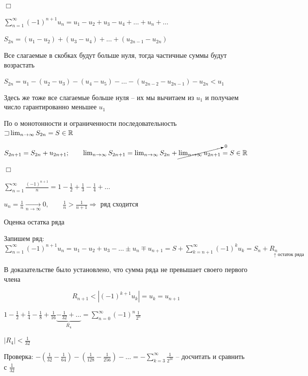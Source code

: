\documentclass[12pt]{article}
\begin{document}
    \begin{MyProof}
        $\Box$

        $\sum_{n = 1}^\infty (-1)^{n + 1} u_n = u_1 - u_2 + u_3 - u_4 + \dots + u_n + \dots$

        $S_{2n} = (u_1 - u_2) + (u_3 - u_4) + \dots + (u_{2n - 1} - u_{2n})$

        Все слагаемые в скобках будут больше нуля, тогда частичные суммы будут возрастать

        $S_{2n} = u_1 - (u_2 - u_3) - (u_4 - u_5) - \dots - (u_{2n - 2} - u_{2n - 1}) - u_{2n} < u_1$

        Здесь же тоже все слагаемые больше нуля -- их мы вычитаем из $u_1$ и получаем число гарантированно меньшее $u_1$

        По \Ths о монотонности и ограниченности последовательность $\mathord{\sqsupset} \lim_{n \to \infty} S_{2n} = S \in \mathbb{R}$

        $S_{2n + 1} = S_{2n} + u_{2n + 1}; \qquad \lim_{n \to \infty} S_{2n + 1} = \lim_{n \to \infty} S_{2n} + \cancelto{0}{\lim_{n \to \infty} u_{2n + 1}} = S \in \mathbb{R}$

        $\Box$
    \end{MyProof}

    \Exs $\sum_{n = 1}^\infty \frac{(-1)^{n + 1}}{n} = 1 - \frac{1}{2} + \frac{1}{3} - \frac{1}{4} + \dots$

    $u_n = \frac{1}{n} \underset{n \to \infty}{\longrightarrow} 0, \qquad \frac{1}{n} > \frac{1}{n + 1} \Longrightarrow$ ряд сходится

    \hypertarget{seriesremainderevaluation}{}

    \Nota Оценка остатка ряда

    Запишем ряд: $\sum_{n = 1}^\infty (-1)^{n + 1} u_n = u_1 - u_2 + u_3 - \dots \pm u_n \mp u_{n + 1} =
    S + \sum_{k = n + 1}^\infty (-1)^{k} u_k = S_n + \underset{\uparrow \text{ остаток ряда}}{R_n\phantom{ikkkkkkkk}}$

    В доказательстве \Ths было установлено, что сумма ряда не превышает своего первого члена

    \[R_{n + 1} < |(-1)^{k + 1} u_k| = u_k = u_{n + 1}\]

    \Ex $1 - \frac{1}{2} + \frac{1}{4} - \frac{1}{8} + \frac{1}{16} \underset{R_4}{\underbrace{ - \frac{1}{32} + \dots}} = \sum_{n = 0}^\infty (-1)^n \frac{1}{2^n}$

    $|R_4| < \frac{1}{32}$

    Проверка: $-\left(\frac{1}{32} - \frac{1}{64}\right) - \left(\frac{1}{128} - \frac{1}{256}\right) - \dots = -\sum_{k = 3}^\infty \frac{1}{2^{2k}}$ -- \Lab досчитать и сравнить с $\frac{1}{32}$
\end{document}

